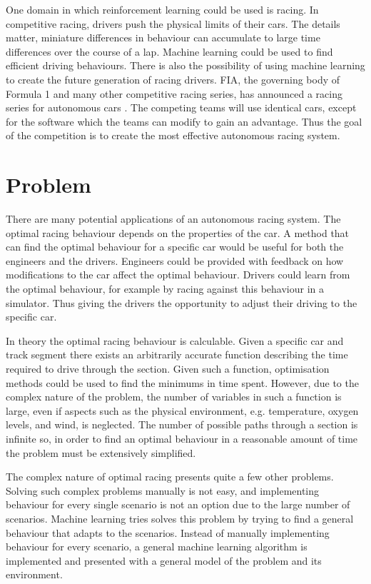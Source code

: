 One domain in which reinforcement learning could be used is racing. In competitive racing, drivers push the physical limits of their cars. The details matter, miniature differences in behaviour can accumulate to large time differences over the course of a lap. Machine learning could be used to find efficient driving behaviours. There is also the possibility of using machine learning to create the future generation of racing drivers. FIA, the governing body of Formula 1 and many other competitive racing series, has announced a racing series for autonomous cars \cite{roborace}. The competing teams will use identical cars, except for the software which the teams can modify to gain an advantage. Thus the goal of the competition is to create the most effective autonomous racing system. 

\section{Problem}
There are many potential applications of an autonomous racing system. The optimal racing behaviour depends on the properties of the car. A method that can find the optimal behaviour for a specific car would be useful for both the engineers and the drivers. Engineers could be provided with feedback on how modifications to the car affect the optimal behaviour. Drivers could learn from the optimal behaviour, for example by racing against this behaviour in a simulator. Thus giving the drivers the opportunity to adjust their driving to the specific car.

In theory the optimal racing behaviour is calculable. Given a specific car and track segment there exists an arbitrarily accurate function describing the time required to drive through the section. Given such a function, optimisation methods could be used to find the minimums in time spent. However, due to the complex nature of the problem, the number of variables in such a function is large, even if aspects such as the physical environment, e.g. temperature, oxygen levels, and wind, is neglected. The number of possible paths through a section is infinite so, in order to find an optimal behaviour in a reasonable amount of time the problem must be extensively simplified.

The complex nature of optimal racing presents quite a few other problems. Solving such complex problems manually is not easy, and implementing behaviour for every single scenario is not an option due to the large number of scenarios. Machine learning tries solves this problem by trying to find a general behaviour that adapts to the scenarios. Instead of manually implementing behaviour for every scenario, a general machine learning algorithm is implemented and presented with a general model of the problem and its environment.

